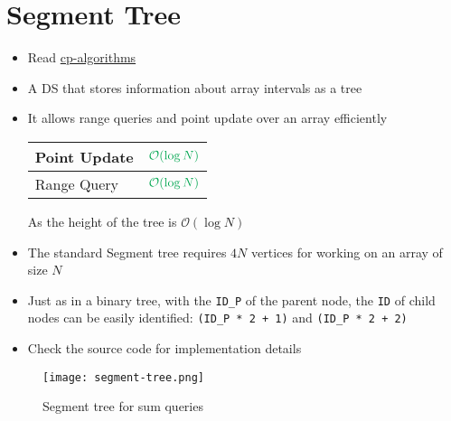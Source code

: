 \section{Segment Tree}
\begin{itemize}
	\item Read \href{https://cp-algorithms.com/data_structures/segment_tree.html}{cp-algorithms}
	\item A \ac{DS} that stores information about array intervals as a tree
	\item It allows range queries and point update over an array efficiently
	\begin{center}
		\begin{tabular}{|l|c|}
			\hline
			Point Update & $ \color{Green} \mathcal{O} (\log N) $ \\ \hline
			Range Query & $ \color{Green} \mathcal{O} (\log N) $ \\ \hline
		\end{tabular}
	\end{center}
	As the height of the tree is $ \mathcal{O} (\log N) $
	\item The standard Segment tree requires $ 4N $ vertices for working on an array of size $ N $
	\item Just as in a binary tree, with the \texttt{ID\_P} of the parent node, the \texttt{ID} of child nodes can be easily identified: \texttt{(ID\_P * 2 + 1)} and \texttt{(ID\_P * 2 + 2)}
	\item Check the source code for implementation details
\end{itemize}

\begin{figure}[hbt!]
	\centering
	\texttt{[image: segment-tree.png]}
	\caption{Segment tree for sum queries}
\end{figure}


